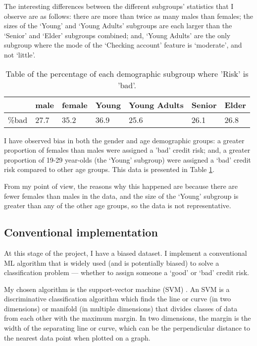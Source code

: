 \documentclass[conference]{IEEEtran}
\begin{document}
The interesting differences between the different subgroups' statistics that I observe are as follows: there are more than twice as many males than females; the sizes of the `Young' and `Young Adults' subgroups are each larger than the `Senior' and `Elder' subgroups combined; and, `Young Adults' are the only subgroup where the mode of the `Checking account' feature is `moderate', and not `little'. 

\begin{table}[h]
\begin{center}
\caption{Table of the percentage of each demographic subgroup where 'Risk' is 'bad'.}
\begin{tabularx}{0.49\textwidth} { |X|X|X|X|X|X|X| } 
    \hline
            & male & female & Young & Young Adults & Senior & Elder \\ 
        \hline
        \%bad & 27.7 & 35.2 & 36.9 & 25.6 & 26.1 & 26.8 \\
        \hline
\end{tabularx}
\label{table:4}
\end{center}
\end{table}

I have observed bias in both the gender and age demographic groups: a greater proportion of females than males were assigned a 'bad' credit risk; and, a greater proportion of 19-29 year-olds (the `Young' subgroup) were assigned a `bad' credit risk compared to other age groups. This data is presented in Table \ref{table:4}. 

From my point of view, the reasons why this happened are because there are fewer females than males in the data, and the size of the `Young' subgroup is greater than any of the other age groups, so the data is not representative.

\subsection{Conventional implementation}
At this stage of the project, I have a biased dataset. I implement a conventional ML algorithm that is widely used (and is potentially biased) to solve a classification problem --- whether to assign someone a `good' or `bad' credit risk.

My chosen algorithm is the support-vector machine (SVM) \cite{Cortes1995}. An SVM is a discriminative classification algorithm which finds the line or curve (in two dimensions) or manifold (in multiple dimensions) that divides classes of data from each other with the maximum margin. In two dimensions, the margin is the width of the separating line or curve, which can be the perpendicular distance to the nearest data point when plotted on a graph.
\end{document}
